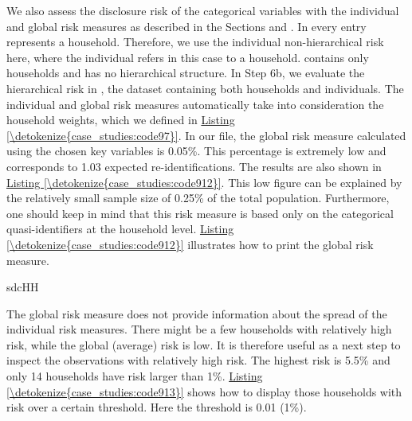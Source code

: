\documentclass[letterpaper,10pt,english]{sphinxmanual}
\begin{document}
We also assess the disclosure risk of the categorical variables with the
individual and global risk measures as described in the Sections
 and
.
In  every entry represents a household. Therefore, we use
the individual non-hierarchical risk here, where the individual refers
in this case to a household.  contains only households and has
no hierarchical structure. In Step 6b, we evaluate the hierarchical risk
in , the dataset containing both households and individuals. The
individual and global risk measures automatically take into
consideration the household weights, which we defined in \hyperref[\detokenize{case_studies:code97}]{Listing \ref{\detokenize{case_studies:code97}}}. In
our file, the global risk measure calculated using the chosen key
variables is 0.05\%. This percentage is extremely low and corresponds to
1.03 expected re-identifications. The results are also shown in \hyperref[\detokenize{case_studies:code912}]{Listing \ref{\detokenize{case_studies:code912}}}.
This low figure can be explained by the relatively small sample
size of 0.25\% of the total population. Furthermore, one should keep in
mind that this risk measure is based only on the categorical
quasi-identifiers at the household level. \hyperref[\detokenize{case_studies:code912}]{Listing \ref{\detokenize{case_studies:code912}}} illustrates how
to print the global risk measure.

\def\sphinxLiteralBlockLabel{\label{\detokenize{case_studies:code912}}}
%
\begin{sphinxVerbatim}[commandchars=\\\{\},numbers=left,firstnumber=1,stepnumber=1]
sdcHH 

\end{sphinxVerbatim}

The global risk measure does not provide information about the spread of
the individual risk measures. There might be a few households with
relatively high risk, while the global (average) risk is low. It is
therefore useful as a next step to inspect the observations with
relatively high risk. The highest risk is 5.5\% and only 14 households
have risk larger than 1\%. \hyperref[\detokenize{case_studies:code913}]{Listing \ref{\detokenize{case_studies:code913}}} shows how to display those
households with risk over a certain threshold. Here the threshold is
0.01 (1\%).
\end{document}
